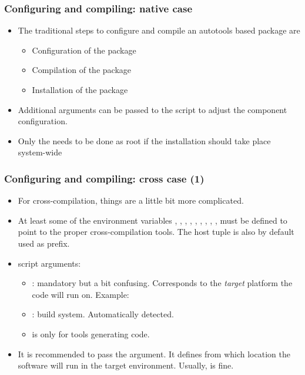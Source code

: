 \begin{frame}
  \frametitle{Configuring and compiling: native case}
  \begin{itemize}
  \item The traditional steps to configure and compile an autotools
    based package are
    \begin{itemize}
    \item Configuration of the package\\
    \item Compilation of the package\\
    \item Installation of the package\\
    \end{itemize}
  \item Additional arguments can be passed to the 
    script to adjust the component configuration.
  \item Only the  needs to be done as root if the
    installation should take place system-wide
  \end{itemize}
\end{frame}

\begin{frame}
  \frametitle{Configuring and compiling: cross case (1)}
  \begin{itemize}
  \item For cross-compilation, things are a little bit more complicated.
  \item At least some of the environment variables ,
    , , , , ,
    , , ,  must be
    defined to point to the proper cross-compilation tools. The host
    tuple is also by default used as prefix.
  \item {} script arguments:
    \begin{itemize}
    \item {}: mandatory but a bit confusing.
     Corresponds to the {\em target} platform the code will run on.
     Example: 
    \item {}: build system. Automatically detected.
    \item {} is only for tools generating code.
    \end{itemize}
  \item It is recommended to pass the  argument. It
    defines from which location the software will run in the target
    environment. Usually,  is fine.
  \end{itemize}
\end{frame}

